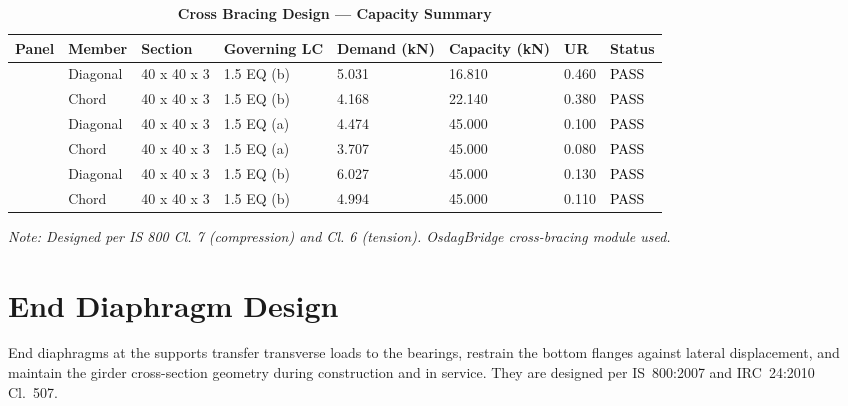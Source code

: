 \documentclass[12pt,a4paper]{report}
\numberwithin{table}{chapter}
\numberwithin{figure}{chapter}
\begin{document}
\vspace{1em}
\begin{longtable}{|C{2.0cm}|L{1.8cm}|C{2.2cm}|C{3.0cm}|C{1.8cm}|C{1.8cm}|C{1.2cm}|C{1.8cm}|}
\caption{\textbf{Cross Bracing Design --- Capacity Summary}}
\hline
\textbf{Panel} & \textbf{Member} & \textbf{Section} & \textbf{Governing LC} & \textbf{Demand (kN)} & \textbf{Capacity (kN)} & \textbf{UR} & \textbf{Status} \\[6pt]
\hline
{} & Diagonal & 40 x 40 x 3 & 1.5 EQ (b) & 5.031 & 16.810 & 0.460 & \textcolor{black}{PASS} \\[6pt]
 & Chord & 40 x 40 x 3 & 1.5 EQ (b) & 4.168 & 22.140 & 0.380 & \textcolor{black}{PASS} \\[6pt]
\hline
{} & Diagonal & 40 x 40 x 3 & 1.5 EQ (a) & 4.474 & 45.000 & 0.100 & \textcolor{black}{PASS} \\[6pt]
 & Chord & 40 x 40 x 3 & 1.5 EQ (a) & 3.707 & 45.000 & 0.080 & \textcolor{black}{PASS} \\[6pt]
\hline
{} & Diagonal & 40 x 40 x 3 & 1.5 EQ (b) & 6.027 & 45.000 & 0.130 & \textcolor{black}{PASS} \\[6pt]
 & Chord & 40 x 40 x 3 & 1.5 EQ (b) & 4.994 & 45.000 & 0.110 & \textcolor{black}{PASS} \\[6pt]
\hline
\end{longtable}
\noindent\textit{Note: Designed per IS 800 Cl. 7 (compression) and Cl. 6 (tension). OsdagBridge cross-bracing module used.}

\section{End Diaphragm Design}
\label{sec:end-diaphragm}

End diaphragms at the supports transfer transverse loads to the bearings, restrain the bottom flanges against lateral displacement, and maintain the girder cross-section geometry during construction and in service. They are designed per IS~800:2007 and IRC~24:2010 Cl.~507.

\vspace{1em}

\vspace{0.4em}
\noindent
\setlength{\tabcolsep}{4pt}
\setlength{\LTleft}{0pt}
\setlength{\LTright}{\fill}
\end{document}
